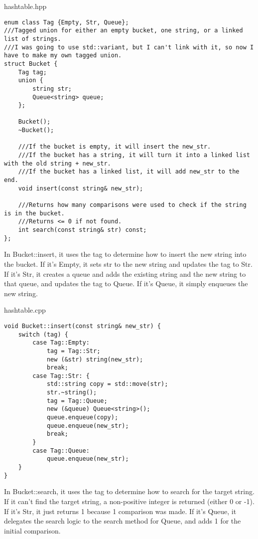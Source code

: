 \documentclass[letterpaper, 10pt,DIV=13]{scrartcl}
\numberwithin{equation}{section} %
\numberwithin{figure}{section} %
\numberwithin{table}{section} %
\begin{document}
hashtable.hpp
\begin{verbatim}
enum class Tag {Empty, Str, Queue};
///Tagged union for either an empty bucket, one string, or a linked list of strings.
///I was going to use std::variant, but I can't link with it, so now I have to make my own tagged union.
struct Bucket {
    Tag tag;
    union {
        string str;
        Queue<string> queue;
    };

    Bucket();
    ~Bucket();

    ///If the bucket is empty, it will insert the new_str.
    ///If the bucket has a string, it will turn it into a linked list with the old string + new_str.
    ///If the bucket has a linked list, it will add new_str to the end.
    void insert(const string& new_str);

    ///Returns how many comparisons were used to check if the string is in the bucket.
    ///Returns <= 0 if not found.
    int search(const string& str) const;
};
\end{verbatim}

In Bucket::insert, it uses the tag to determine how to insert the new string into the bucket. If it's Empty,
it sets str to the new string and updates the tag to Str. If it's Str, it creates a queue and adds the existing
string and the new string to that queue, and updates the tag to Queue. If it's Queue, it simply enqueues the new
string.

hashtable.cpp
\begin{verbatim}
void Bucket::insert(const string& new_str) {
    switch (tag) {
        case Tag::Empty:
            tag = Tag::Str;
            new (&str) string(new_str);
            break;
        case Tag::Str: {
            std::string copy = std::move(str);
            str.~string();
            tag = Tag::Queue;
            new (&queue) Queue<string>();
            queue.enqueue(copy);
            queue.enqueue(new_str);
            break;
        }
        case Tag::Queue:
            queue.enqueue(new_str);
    }
}
\end{verbatim}

In Bucket::search, it uses the tag to determine how to search for the target string. If it can't find the target
string, a non-positive integer is returned (either 0 or -1). If it's Str, it just returns 1 because 1 comparison
was made. If it's Queue, it delegates the search logic to the search method for Queue, and adds 1 for the initial
comparison.
\end{document}
